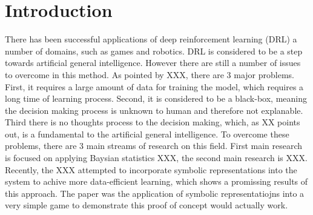 \documentclass[12pt,twoside]{report}
\date{June 2018}
\begin{document}



\clearpage{\pagestyle{empty}\cleardoublepage}
\setcounter{page}{1}
\pagestyle{fancy}

%
%

\tableofcontents


\clearpage{\pagestyle{empty}\cleardoublepage}
\setcounter{page}{1}
\fancyhead[LE,RO]{\slshape \rightmark}
\fancyhead[LO,RE]{\slshape \leftmark}

\chapter{Introduction}



There has been successful applications of deep reinforcement learning (DRL) a number of domains, such as games and robotics.
DRL is considered to be a step towards artificial general intelligence.
However there are still a number of issues to overcome in this method. As pointed by XXX, there are 3 major problems.
First, it requires a large amount of data for training the model, which requires a long time of learning process.
Second, it is considered to be a black-box, meaning the decision making process is unknown to human and therefore not explanable.
Third there is no thoughts process to the decision making, which, as XX points out, is a fundamental to the artificial general intelligence.
To overcome these problems, there are 3 main streams of research on this field.
First main research is focused on applying Baysian statistics XXX, the second main research is XXX.
Recently, the XXX attempted to incorporate symbolic representations into the system to achive more data-efficient learning, which shows a promissing results of this approach.
The paper was the application of symbolic representatiojns into a very simple game to demonstrate this proof of concept would actually work.
\end{document}
